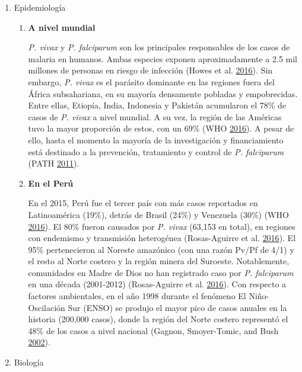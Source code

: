 \documentclass[
  a4paper]{article}
\begin{document}
\begin{enumerate}
\def\labelenumi{\alph{enumi}.}
\item
  Epidemiología

  \begin{enumerate}
  \def\labelenumii{\roman{enumii}.}
  \item
    \textbf{A nivel mundial}

    \emph{P. vivax} y \emph{P. falciparum} son los principales
    responsables de los casos de malaria en humanos. Ambas especies
    exponen aproximadamente a 2.5 mil millones de personas en riesgo de
    infección (Howes et al.
    \protect\hyperlink{ref-howes2016global}{2016}). Sin embargo,
    \emph{P. vivax} es el parásito dominante en las regiones fuera del
    África subsahariana, en su mayoría densamente pobladas y
    empobrecidas. Entre ellas, Etiopía, India, Indonesia y Pakistán
    acumularon el 78\% de casos de \emph{P. vivax} a nivel mundial. A su
    vez, la región de las Américas tuvo la mayor proporción de estos,
    con un 69\% (WHO \protect\hyperlink{ref-WHO2016world}{2016}). A
    pesar de ello, hasta el momento la mayoría de la investigación y
    financiamiento está destinado a la prevención, tratamiento y control
    de \emph{P. falciparum} (PATH
    \protect\hyperlink{ref-path2011}{2011}).
  \item
    \textbf{En el Perú}

    En el 2015, Perú fue el tercer país con más casos reportados en
    Latinoamérica (19\%), detrás de Brasil (24\%) y Venezuela (30\%)
    (WHO \protect\hyperlink{ref-WHO2016world}{2016}). El 80\% fueron
    causados por \emph{P. vivax} (63,153 en total), en regiones con
    endemismo y transmisión heterogénea (Rosas-Aguirre et al.
    \protect\hyperlink{ref-rosas2016peru}{2016}). El 95\% pertenecieron
    al Noreste amazónico (con una razón Pv/Pf de 4/1) y el resto al
    Norte costero y la región minera del Suroeste. Notablemente,
    comunidades en Madre de Dios no han registrado caso por \emph{P.
    falciparum} en una década (2001-2012) (Rosas-Aguirre et al.
    \protect\hyperlink{ref-rosas2016peru}{2016}). Con respecto a
    factores ambientales, en el año 1998 durante el fenómeno El
    Niño-Oscilación Sur (ENSO) se produjo el mayor pico de casos anuales
    en la historia (200,000 casos), donde la región del Norte costero
    representó el 48\% de los casos a nivel nacional (Gagnon,
    Smoyer-Tomic, and Bush
    \protect\hyperlink{ref-gagnon2002enso}{2002}). 
  \end{enumerate}
\item
  Biología


\end{enumerate}
\end{document}

